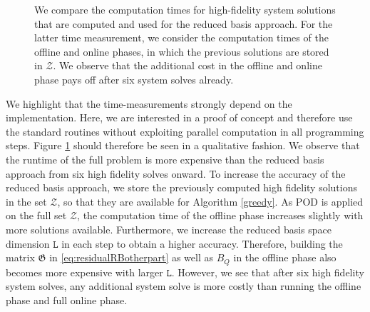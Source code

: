 \documentclass{article}
\theoremstyle{plain}
\theoremstyle{definition}
\theoremstyle{remark}
\begin{document}
\begin{figure}%
    \centering
{}
    \caption{We compare the computation times for high-fidelity system solutions that are computed and used for the reduced basis approach. For the latter time measurement, we consider the computation times of the offline and online phases, in which the previous solutions are stored in $\mathcal{Z}$. We observe that the additional cost in the offline and online phase pays off after six system solves already.}\label{fig:calculation_time}
\end{figure}


We highlight that the time-measurements strongly depend on the implementation. Here, we are interested in a proof of concept and therefore use the standard routines without exploiting parallel computation in all programming steps. Figure \ref{fig:calculation_time} should therefore be seen in a qualitative fashion. We observe that the runtime of the full problem is more expensive than the reduced basis approach from six high fidelity solves onward. To increase the accuracy of the reduced basis approach, we store the previously computed high fidelity solutions in the set $\mathcal{Z}$, so that they are available for Algorithm \ref{greedy}. As POD is applied on the full set $\mathcal{Z}$, the computation time of the offline phase increases slightly with more solutions available. Furthermore, we increase the reduced basis space dimension $\texttt{L}$ in each step to obtain a higher accuracy. Therefore, building the matrix $\mathfrak{G}$ in \eqref{eq:residualRBotherpart} as well as $B_Q$ in the offline phase also becomes more expensive with larger $\texttt{L}$. However, we see that after six high fidelity system solves, any additional system solve is more costly than running the offline phase and full online phase.
\end{document}
